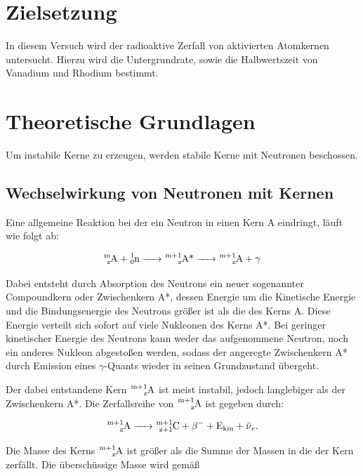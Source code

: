 \section{Zielsetzung}
In diesem Versuch wird der radioaktive Zerfall von aktivierten Atomkernen untersucht.
Hierzu wird die Untergrundrate, sowie die Halbwertszeit von Vanadium und Rhodium bestimmt. 

\section{Theoretische Grundlagen}
Um instabile Kerne zu erzeugen, werden stabile Kerne mit Neutronen beschossen.

\subsection{Wechselwirkung von Neutronen mit Kernen}

\noindent
Eine allgemeine Reaktion bei der ein Neutron in einen Kern A eindringt, läuft wie folgt ab:

\begin{equation*}
\ce{^{\text{m}}_{\text{z}}A + ^1_0n -> ^{\text{m}+1}_{\text{z}}A\text{*} -> ^{\text{m}+1}_{\text{z}}A + }\gamma
\end{equation*}

\noindent
Dabei entsteht durch Absorption des Neutrons ein neuer sogenannter Compoundkern oder Zwischenkern A*, 
dessen Energie um die Kinetische Energie und die Bindungsenergie des Neutrons größer ist als die des Kerns A.
Diese Energie verteilt sich sofort auf viele Nukleonen des Kerns A*.
Bei geringer kinetischer Energie des Neutrons kann weder das aufgenommene Neutron, noch ein anderes Nukleon abgestoßen werden, 
sodass der angeregte Zwischenkern A* durch Emission eines $\gamma$-Quants wieder in seinen Grundzustand übergeht.

\noindent
Der dabei entstandene Kern $\ce{^{\text{m}+1}_{\text{z}}A}$ ist meist instabil, 
jedoch langlebiger als der Zwischenkern A*.
Die Zerfallsreihe von $\ce{^{\text{m}+1}_{\text{z}}A}$ ist gegeben durch:

\begin{equation*}
\ce{^{\text{m}+1}_{\text{z}}A -> ^{\text{m}+1}_{\text{z}+1}C +} \beta^{-} \ce{+ \text{E}_{\text{kin}} + \bar{\nu}_{e}}.
\end{equation*}

\noindent
Die Masse des Kerns $\ce{^{\text{m}+1}_{\text{z}}A}$ ist größer als die Summe der Massen in die der Kern zerfällt.
Die überschüssige Masse wird gemäß

